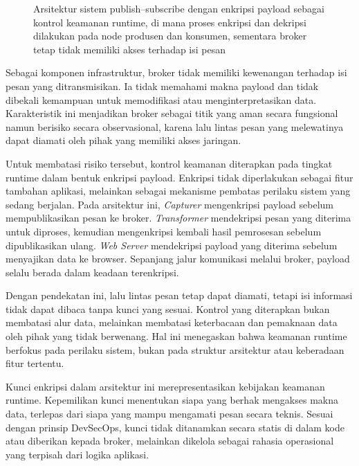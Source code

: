 \begin{figure}[htbp]
{{%
}
}
\caption{Arsitektur sistem publish--subscribe dengan enkripsi payload sebagai kontrol keamanan runtime, di mana proses enkripsi dan dekripsi dilakukan pada node produsen dan konsumen, sementara broker tetap tidak memiliki akses terhadap isi pesan}
\label{fig:broker-pubsub-runtime-encryption}
\end{figure}

Sebagai komponen infrastruktur, broker tidak memiliki kewenangan terhadap isi pesan yang ditransmisikan. Ia tidak memahami makna payload dan tidak dibekali kemampuan untuk memodifikasi atau menginterpretasikan data. Karakteristik ini menjadikan broker sebagai titik yang aman secara fungsional namun berisiko secara observasional, karena lalu lintas pesan yang melewatinya dapat diamati oleh pihak yang memiliki akses jaringan.

Untuk membatasi risiko tersebut, kontrol keamanan diterapkan pada tingkat runtime dalam bentuk enkripsi payload. Enkripsi tidak diperlakukan sebagai fitur tambahan aplikasi, melainkan sebagai mekanisme pembatas perilaku sistem yang sedang berjalan. Pada arsitektur ini, \emph{Capturer} mengenkripsi payload sebelum mempublikasikan pesan ke broker. \emph{Transformer} mendekripsi pesan yang diterima untuk diproses, kemudian mengenkripsi kembali hasil pemrosesan sebelum dipublikasikan ulang. \emph{Web Server} mendekripsi payload yang diterima sebelum menyajikan data ke browser. Sepanjang jalur komunikasi melalui broker, payload selalu berada dalam keadaan terenkripsi.

Dengan pendekatan ini, lalu lintas pesan tetap dapat diamati, tetapi isi informasi tidak dapat dibaca tanpa kunci yang sesuai. Kontrol yang diterapkan bukan membatasi alur data, melainkan membatasi keterbacaan dan pemaknaan data oleh pihak yang tidak berwenang. Hal ini menegaskan bahwa keamanan runtime berfokus pada perilaku sistem, bukan pada struktur arsitektur atau keberadaan fitur tertentu.

Kunci enkripsi dalam arsitektur ini merepresentasikan kebijakan keamanan runtime. Kepemilikan kunci menentukan siapa yang berhak mengakses makna data, terlepas dari siapa yang mampu mengamati pesan secara teknis. Sesuai dengan prinsip DevSecOps, kunci tidak ditanamkan secara statis di dalam kode atau diberikan kepada broker, melainkan dikelola sebagai rahasia operasional yang terpisah dari logika aplikasi.

